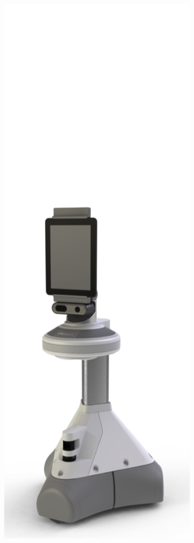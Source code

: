 \begin{figure}[ht]
\begin{minipage}[b]{.25\linewidth}
      \label{fig:x} 
   \end{minipage}%
   \hfill
   \begin{minipage}[b]{.25\linewidth} 
      \centering 
      \includegraphics[width=0.9\textwidth]{bilder/grundlagen/2.png} 

\end{minipage}
\end{figure}
